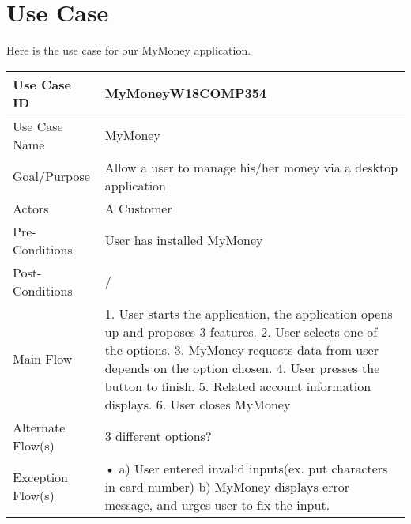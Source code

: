 \documentclass{article}
\begin{document}
\section{Use Case}
Here is the use case for our MyMoney application.

\medskip
\begin{center}
\begin{tabular}{| l | p{6cm} |}
\hline

Use Case ID  & MyMoneyW18COMP354\\
\hline
Use Case Name  & MyMoney\\
\hline
Goal/Purpose  & Allow a user to manage his/her money via a desktop application\\
\hline
Actors  & A Customer\\
\hline
Pre-Conditions &  User has installed MyMoney \\
\hline
Post-Conditions &  /\\
\hline
Main Flow & 1. User starts the application, the application opens up and proposes 3 features.
2. User  selects one of the options.
3. MyMoney requests data from user depends on the option chosen.
4. User presses the button to finish.
5. Related account information displays.
6. User closes MyMoney\\
\hline
Alternate Flow(s) & 3 different options?\\
\hline
Exception Flow(s) & • a) User entered invalid inputs(ex. put characters in card number)
   b) MyMoney displays error message, and urges user to fix the input. \\
\hline

\end{tabular}
\end{center}
\end{document}
